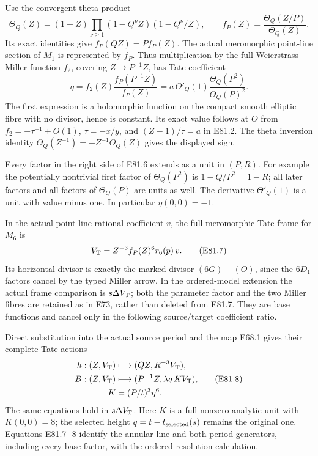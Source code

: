 Use the convergent theta product
\[
 \Theta_Q(Z)=(1-Z)\prod_{\nu\ge1}
                       (1-Q^\nu Z)(1-Q^\nu/Z),
 \qquad f_P(Z)=\frac{\Theta_Q(Z/P)}{\Theta_Q(Z)}.
\]
Its exact identities give \(f_P(QZ)=P f_P(Z)\). The
actual meromorphic point-line section of \(M_1\) is
represented by \(f_P\). Thus multiplication by the full
Weierstrass Miller function \(f_2\), covering \(Z\mapsto
P^{-1}Z\), has Tate coefficient
\[
 \eta=f_2(Z)\frac{f_P(P^{-1}Z)}{f_P(Z)}
      =a\,\Theta'_Q(1)
                  \frac{\Theta_Q(P^2)}{\Theta_Q(P)^2}.
 \tag{E81.6}
\]
The first expression is a holomorphic function on the compact
smooth elliptic fibre with no divisor, hence is constant.
Its exact value follows at \(O\) from
\(f_2=-\tau^{-1}+O(1)\), \(\tau=-x/y\), and
\((Z-1)/\tau=a\) in E81.2. The theta inversion identity
\(\Theta_Q(Z^{-1})=-Z^{-1}\Theta_Q(Z)\) gives the displayed
sign.

Every factor in the right side of E81.6 extends as a unit
in \((P,R)\). For example the potentially nontrivial first
factor of \(\Theta_Q(P^2)\) is \(1-Q/P^2=1-R\);
all later factors and all factors of \(\Theta_Q(P)\)
are units as well. The derivative \(\Theta'_Q(1)\) is a
unit with value minus one. In particular \(\eta(0,0)=-1\).

In the actual point-line rational coefficient \(v\), the
full meromorphic Tate frame for \(M_6\) is
\[
 V_{\rm T}=Z^{-3}f_P(Z)^6 r_6(p)\,v.            \tag{E81.7}
\]
Its horizontal divisor is exactly the marked divisor
\((6G)-(O)\), since the \(6D_1\) factors cancel by the
typed Miller arrow. In the ordered-model extension the
actual frame comparison is \(s\Delta V_{\rm T}\);
both the parameter factor and the two Miller fibres
are retained as in E73, rather than deleted from E81.7.
They are base functions and cancel only in the following
source/target coefficient ratio.

Direct substitution into the actual source period and the
map E68.1 gives their complete Tate actions
\[
\begin{aligned}
 h:(Z,V_{\rm T})&\longmapsto
                     (QZ,R^{-3}V_{\rm T}),\\
 B:(Z,V_{\rm T})&\longmapsto
                     (P^{-1}Z,\lambda q\,K V_{\rm T}),\\
 K&=(P/t)^3\eta^6 .
\end{aligned}                                                   \tag{E81.8}
\]
The same equations hold in \(s\Delta V_{\rm T}\).
Here \(K\) is a full nonzero analytic unit with \(K(0,0)=8\);
the selected height \(q=t-t_{\rm selected}(s)\) remains
the original one. Equations E81.7-\/-8 identify the annular
line and both period generators, including every base
factor, with the ordered-resolution calculation.

